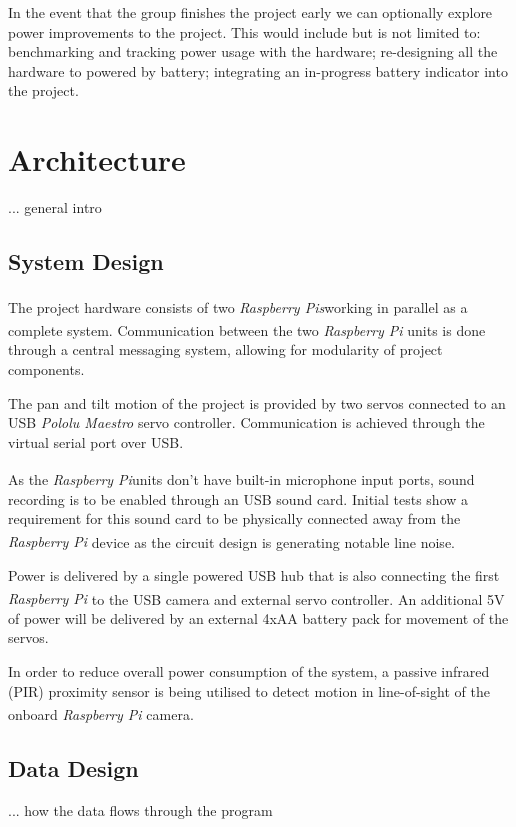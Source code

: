 \documentclass[11pt,a4paper,titlepage]{report}
\newcommand{\rpi}{\textit{Raspberry Pi\textsuperscript{\textregistered}}}
\newcommand{\rpis}{\textit{Raspberry Pi\textsuperscript{\textregistered}s}}
\begin{document}
In the event that the group finishes the project early we can optionally explore power improvements to the project. This would include but is not limited to: benchmarking and tracking power usage with the hardware; re-designing all the hardware to powered by battery; integrating an in-progress battery indicator into the project.



\section{Architecture}

{\color{red}... general intro}

\subsection{System Design}

The project hardware consists of two \rpis working in parallel as a complete system. Communication between the two \rpi\xspace units is done through a central messaging system, allowing for modularity of project components.

The pan and tilt motion of the project is provided by two servos connected to an USB \textit{Pololu Maestro} servo controller. {\color{red} Communication is achieved through the virtual serial port over USB.}


As the \rpi units don't have built-in microphone input ports, sound recording is to be enabled through an USB sound card. Initial tests show a requirement for this sound card to be physically connected away from the \rpi\xspace device as the circuit design is generating notable line noise.

Power is delivered by a single powered USB hub that is also connecting the first \rpi\xspace to the USB camera and external servo controller. An additional 5V of power will be delivered by an external 4xAA battery pack for movement of the servos.

In order to reduce overall power consumption of the system, a passive infrared (PIR) proximity sensor is being utilised to detect motion in line-of-sight of the onboard \rpi\xspace camera. 

\subsection{Data Design}

{\color{red}... how the data flows through the program}
\end{document}

